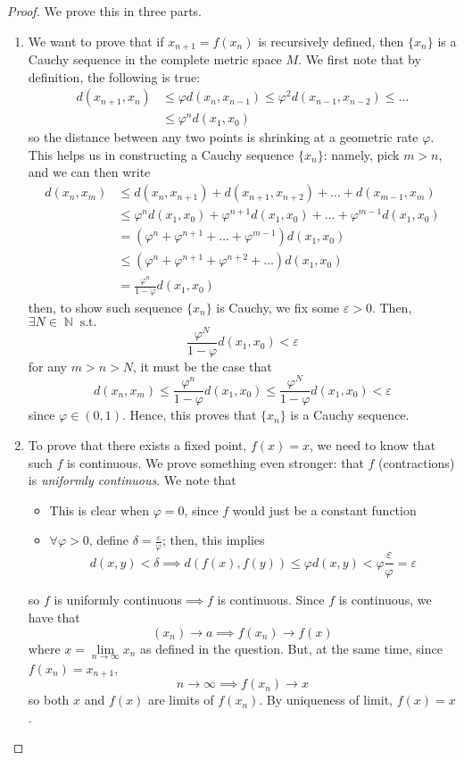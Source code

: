 \documentclass{amsart} %
\theoremstyle{mytheoremstyle}
\theoremstyle{definition}
\numberwithin{equation}{section}
\DeclareMathOperator{\N}{\mathbb{N}}
\DeclareMathOperator{\1}{\mathbbm{1}}
\DeclareMathOperator{\suchthat}{\text{ s.t. }}
\renewcommand{\leq}{\leqslant}
\renewcommand{\leq}{\leqslant}
\begin{document}
\begin{proof}
	We prove this in three parts.
	\begin{enumerate}[label=(\arabic*)]
		\item  We want to prove that if $x_{n+1} = f(x_n)$ is recursively defined, then $\{x_n\}$ is a Cauchy sequence in the complete metric space $M$. We first note that by definition, the following is true:
		\begin{align*}
		d( x_{n+1}, x_n ) &\leq  \varphi d( x_n , x_{n-1} ) \leq  \varphi^2 d( x_{n-1} , x_{n-2} ) \leq \dots \\
		& \leq \varphi^n d(x_1,x_0)
		\end{align*}
		so the distance between any two points is shrinking at a geometric rate $\varphi$. This helps us in constructing a Cauchy sequence $\{x_n\}$: namely, pick $m > n$, and we can then write
		\begin{align*}
		d( x_{n}, x_m ) &\leq   d( x_n , x_{n+1} ) +   d( x_{n+1} , x_{n+2} ) + \dots + d( x_{m-1} , x_{m} ) \\
		&\leq \varphi^n d(x_1,x_0) + \varphi^{n+1} d(x_1,x_0) + \dots + \varphi^{m-1} d(x_1,x_0) \\
		&= (\varphi^n + \varphi^{n+1} + \dots + \varphi^{m-1}) d(x_1,x_0) \\
		&\leq (\varphi^n + \varphi^{n+1} + \varphi^{n+2} + \dots) d(x_1,x_0) \\	
		&= \frac{\varphi^n }{1 - \varphi }d(x_1,x_0) 
		\end{align*}
		then, to show such sequence $\{x_n\}$ is Cauchy, we fix some $\varepsilon>0$. Then, $\exists N \in \N \suchthat$
		$$ \frac{\varphi^N }{1 - \varphi} d(x_1,x_0) < \varepsilon $$
		for any $m > n > N$, it must be the case that
		$$ d(x_n,x_m) \leq \frac{\varphi^n }{1 - \varphi }d(x_1,x_0)  \leq  \frac{\varphi^N }{1 - \varphi} d(x_1,x_0) < \varepsilon $$
		since $\varphi \in (0,1)$. Hence, this proves that $\{x_n\}$ is a Cauchy sequence.
		
		\item 
		To prove that there exists a fixed point, $f(x) = x$, we need to know that such $f$ is continuous. We prove something even stronger: that $f$ (contractions) is \textit{uniformly continuous}. We note that
		\begin{itemize}[noitemsep]
			\item This is clear when $\varphi = 0$, since $f$ would just be a constant function
			\item $\forall \varphi > 0$, define $\delta = \frac{\varepsilon}{\varphi}$; then, this implies
			$$d(x,y) < \delta  \implies d(f(x),f(y)) \leq \varphi d(x,y) < \varphi \frac{\varepsilon}{\varphi} = \varepsilon$$
		\end{itemize}
		so $f$ is uniformly continuous$\implies f$ is continuous. Since $f$ is continuous, we have that
		$$ (x_n) \to a \implies f(x_n) \to f(x) $$
		where $x = \lim\limits_{n \to \infty} x_n$ as defined in the question. But, at the same time, since $f(x_{n}) = x_{n+1}$,
		$$ n \to \infty \implies f(x_n ) \to x $$
		so both $x$ and $f(x)$ are limits of $f(x_n)$. By uniqueness of limit, $f(x)=x$.
		

\end{enumerate}
\end{proof}
\end{document}
